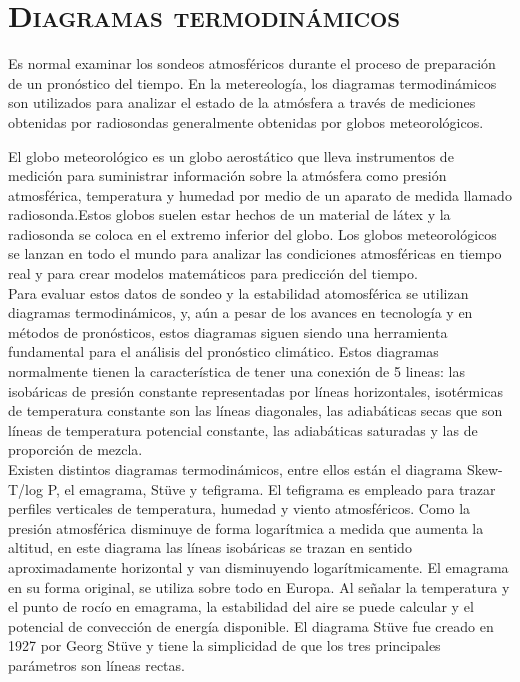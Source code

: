 \documentclass[12pt]{article}
\begin{document}
\section{\textsc{Diagramas termodinámicos}}

Es normal examinar los sondeos atmosféricos durante el proceso de preparación de un pronóstico del tiempo. En la metereología, los diagramas termodinámicos son utilizados para analizar el estado de la atmósfera a través de mediciones obtenidas por radiosondas generalmente obtenidas por globos meteorológicos.

El globo meteorológico es un globo aerostático que lleva instrumentos de medición para suministrar información sobre la atmósfera como presión atmosférica, temperatura y humedad por medio de un aparato de medida llamado radiosonda.Estos globos suelen estar hechos de un material de látex y la radiosonda se coloca en el extremo inferior del globo. Los globos meteorológicos se lanzan en todo el mundo para analizar las condiciones atmosféricas en tiempo real y para crear modelos matemáticos para predicción del tiempo.\\

Para evaluar estos datos de sondeo y la estabilidad atomosférica se utilizan diagramas termodinámicos, y, aún a pesar de los avances en tecnología y en métodos de pronósticos, estos diagramas siguen siendo una herramienta fundamental para el análisis del pronóstico climático.
Estos diagramas normalmente tienen la característica de tener una conexión de 5 lineas: las isobáricas de presión constante representadas por líneas horizontales, isotérmicas de temperatura constante son las líneas diagonales, las adiabáticas secas que son líneas de temperatura potencial constante, las adiabáticas saturadas y las de proporción de mezcla. \\

Existen distintos diagramas termodinámicos, entre ellos están el diagrama Skew-T/log P, el emagrama, Stüve y tefigrama. El tefigrama es empleado para trazar perfiles verticales de temperatura, humedad y viento atmosféricos. Como la presión atmosférica disminuye de forma logarítmica a medida que aumenta la altitud, en este diagrama las líneas isobáricas se trazan en sentido aproximadamente horizontal y van disminuyendo logarítmicamente. El emagrama en su forma original, se utiliza sobre todo en Europa. Al señalar la temperatura y el punto de rocío en emagrama, la estabilidad del aire se puede calcular y el potencial de convección de energía disponible. El diagrama Stüve fue creado en 1927 por Georg Stüve y tiene la simplicidad de que los tres principales parámetros son líneas rectas. 
\end{document}
